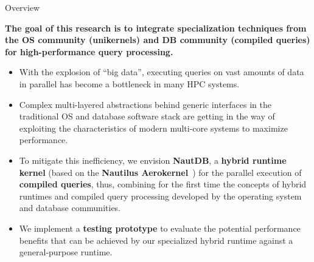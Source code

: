 



\begin{block}{Overview}
\begin{overviewbox}
    \textbf{The goal of this research is to integrate specialization techniques from the OS community
      (unikernels) and  DB community (compiled queries) for high-performance query processing.}
\end{overviewbox}
  \begin{itemize}
  \item   With the explosion of ``big data'', executing queries on vast amounts of data in parallel has become a bottleneck in many HPC systems.
  \item   Complex multi-layered abstractions behind generic interfaces in the traditional OS and database software stack are getting in the way of exploiting the characteristics of modern multi-core systems to maximize performance.
  \item   To mitigate this inefficiency, we envision \textbf{NautDB}, a \textbf{hybrid runtime kernel} (based on the \textbf{Nautilus Aerokernel}~\cite{HALE:2015:NAUTILUS}) for the parallel execution of \textbf{compiled queries}, thus, combining for the first time the concepts of hybrid runtimes and compiled query processing developed by the operating system and database communities.
  \item   We implement a \textbf{testing prototype} to evaluate the potential performance benefits that can be achieved by our specialized hybrid runtime against a general-purpose runtime.
  \end{itemize}
\end{block}

